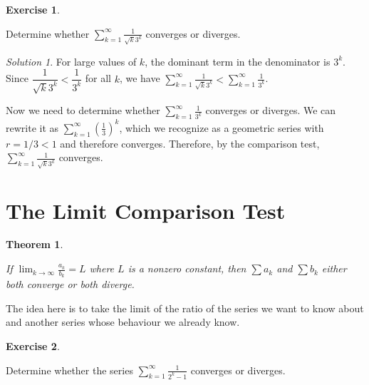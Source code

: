 \documentclass[
]{book}
\newtheorem{theorem}{Theorem}[chapter]
\theoremstyle{definition}
\theoremstyle{definition}
\theoremstyle{definition}
\newtheorem{exercise}{Exercise}[chapter]
\theoremstyle{definition}
\theoremstyle{remark}
\newtheorem*{solution}{Solution}
\begin{document}
\begin{exercise}
\protect\hypertarget{exr:unlabeled-div-202}{}\label{exr:unlabeled-div-202}

Determine whether \(\displaystyle \sum_{k=1}^\infty \frac{1}{\sqrt{k}3^k}\) converges or diverges.

\end{exercise}

\begin{solution}

For large values of \(k\), the dominant term in the denominator is \(3^k\). Since \(\dfrac{1}{\sqrt{k}3^k}<\dfrac{1}{3^k}\) for all \(k\), we have \(\displaystyle \sum_{k=1}^\infty \frac{1}{\sqrt{k}3^k}< \displaystyle \sum_{k=1}^\infty \frac{1}{3^k}\).

Now we need to determine whether \(\displaystyle \sum_{k=1}^\infty \frac{1}{3^k}\) converges or diverges. We can rewrite it as \(\displaystyle \sum_{k=1}^\infty \left (\frac{1}{3}\right)^k\), which we recognize as a geometric series with \(r=1/3<1\) and therefore converges. Therefore, by the comparison test, \(\displaystyle \sum_{k=1}^\infty \frac{1}{\sqrt{k}3^k}\) converges.

\end{solution}

\hypertarget{the-limit-comparison-test}{%
\section{The Limit Comparison Test}\label{the-limit-comparison-test}}

\begin{theorem}
\protect\hypertarget{thm:unlabeled-div-204}{}\label{thm:unlabeled-div-204}

If \(\displaystyle \lim_{k\to\infty}\frac{a_k}{b_k}=L\) where \(L\) is a nonzero constant, then \(\displaystyle \sum a_k\) and \(\displaystyle \sum b_k\) either both converge or both diverge.

\end{theorem}

The idea here is to take the limit of the ratio of the series we want to know about and another series whose behaviour we already know.

\begin{exercise}
\protect\hypertarget{exr:unlabeled-div-205}{}\label{exr:unlabeled-div-205}

Determine whether the series \(\displaystyle \sum_{k=1}^\infty \frac{1}{2^k-1}\) converges or diverges.

\end{exercise}
\end{document}
